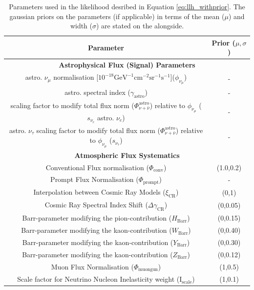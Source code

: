 \begin{table}[h]
    \caption{Parameters used in the likelihood desribed in Equation \ref{eq:llh_withprior}. The gaussian priors on the parameters (if applicable) in terms of the mean ($\mu$) and width ($\sigma$) are stated on the alongside.}
    
    \begin{tabular}{ |c |c|}
        \hline
        Parameter & Prior ($\mu,\sigma$)\\
        \hline
        \hline
        \multicolumn{2}{c}{\textbf{Astrophysical Flux (Signal) Parameters}}\\
        \hline
        astro. $\nu_{\mu}$ normalisation [$10^{-18} \mathrm{GeV}^{-1}\mathrm{cm}^{-2}\mathrm{sr}^{-1}\mathrm{s}^{-1}$]($\phi_{\nu_{\mu}}$) & - \\
        astro. spectral index ($\gamma_{\mathrm{astro}}$) & -\\
        scaling factor to modify total flux norm ($\Phi_{\nu+\bar\nu}^{\mathrm{astro}}$) relative to $\phi_{\nu_{\mu}}$ ($s_{\nu_e}$ astro. $\nu_{e}$)&- \\
        astro. $\nu_{\tau}$ scaling factor to modify total flux norm ($\Phi_{\nu+\bar\nu}^{\mathrm{astro}}$) relative to $\phi_{\nu_{\mu}}$ ($s_{\nu_{\tau}}$) & -\\
        \hline
        \multicolumn{2}{c}{\textbf{Atmospheric Flux Systematics}}\\
        \hline
        Conventional Flux normalisation ($\Phi_{\mathrm{conv}}$)  & (1.0,0.2)\\
        Prompt Flux Normalisation ($\Phi_{\mathrm{prompt}}$) &  - \\
        Interpolation between Cosmic Ray Models ($\xi_{\mathrm{CR}}$)  & (0,1)\\
        Cosmic Ray Spectral Index Shift ($\Delta\gamma_{\mathrm{CR}}$) &  (0,0.05)\\
        Barr-parameter modifying the pion-contribution ($H_{\mathrm{Barr}}$) & (0,0.15)\\
        Barr-parameter modifying the kaon-contribution ($W_{\mathrm{Barr}}$) & (0,0.40)\\
        Barr-parameter modifying the kaon-contribution ($Y_{\mathrm{Barr}}$)& (0,0.30)\\
        Barr-parameter modifying the kaon-contribution ($Z_{\mathrm{Barr}}$) & (0,0.12)\\
        Muon Flux Normalisation ($\Phi_{\mathrm{muongun}}$)  & (1,0.5)\\
        Scale factor for Neutrino Nucleon Inelasticity weight ($\mathrm{I}_{\mathrm{scale}}$) & (1,0.1)\\
        \hline
        

\end{tabular}
\end{table}
